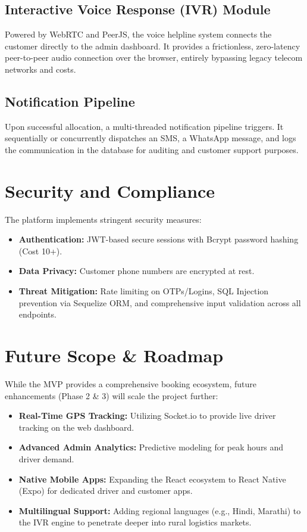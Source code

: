 \documentclass[journal,10pt,twocolumn]{IEEEtran}
\begin{document}
\subsection{Interactive Voice Response (IVR) Module}
Powered by WebRTC and PeerJS, the voice helpline system connects the customer directly to the admin dashboard. It provides a frictionless, zero-latency peer-to-peer audio connection over the browser, entirely bypassing legacy telecom networks and costs.

\subsection{Notification Pipeline}
Upon successful allocation, a multi-threaded notification pipeline triggers. It sequentially or concurrently dispatches an SMS, a WhatsApp message, and logs the communication in the database for auditing and customer support purposes.

\section{Security and Compliance}
The platform implements stringent security measures:
\begin{itemize}
    \item \textbf{Authentication:} JWT-based secure sessions with Bcrypt password hashing (Cost 10+).
    \item \textbf{Data Privacy:} Customer phone numbers are encrypted at rest.
    \item \textbf{Threat Mitigation:} Rate limiting on OTPs/Logins, SQL Injection prevention via Sequelize ORM, and comprehensive input validation across all endpoints.
\end{itemize}

\section{Future Scope \& Roadmap}
While the MVP provides a comprehensive booking ecosystem, future enhancements (Phase 2 \& 3) will scale the project further:
\begin{itemize}
    \item \textbf{Real-Time GPS Tracking:} Utilizing Socket.io to provide live driver tracking on the web dashboard.
    \item \textbf{Advanced Admin Analytics:} Predictive modeling for peak hours and driver demand.
    \item \textbf{Native Mobile Apps:} Expanding the React ecosystem to React Native (Expo) for dedicated driver and customer apps.
    \item \textbf{Multilingual Support:} Adding regional languages (e.g., Hindi, Marathi) to the IVR engine to penetrate deeper into rural logistics markets.
\end{itemize}
\end{document}
